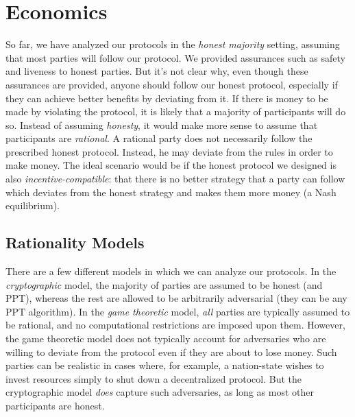 \chapter{Economics}\label{chapter:economics}

So far, we have analyzed our protocols in the \emph{honest majority} setting,
assuming that most parties will follow our protocol. We provided assurances
such as safety and liveness to honest parties. But it's not clear why,
even though these assurances are provided, anyone should follow our honest
protocol, especially if they can achieve better benefits by deviating from
it. If there is money to be made by violating the protocol, it is likely that
a majority of participants will do so. Instead of assuming \emph{honesty},
it would make more sense to assume that participants are \emph{rational}.
A rational party does not necessarily follow the prescribed honest protocol.
Instead, he may deviate from the rules in order to make money.
The ideal scenario would be if the honest protocol we designed is also
\emph{incentive-compatible}:
that there is no better strategy that
a party can follow which deviates from the honest strategy and makes them
more money (a Nash equilibrium).

\section{Rationality Models}

There are a few different models in which we can analyze our protocols.
In the \emph{cryptographic} model, the majority of parties are assumed
to be honest (and PPT), whereas the rest are allowed to be arbitrarily
adversarial (they can be any PPT algorithm). In the \emph{game theoretic}
model, \emph{all} parties are typically assumed to be rational, and
no computational restrictions are imposed upon them. However, the game
theoretic model does not typically account for adversaries who are willing
to deviate from the protocol even if they are about to lose money. Such
parties can be realistic in cases where, for example, a nation-state
wishes to invest resources simply to shut down a decentralized protocol.
But the cryptographic model \emph{does} capture such adversaries, as
long as most other participants are honest.

